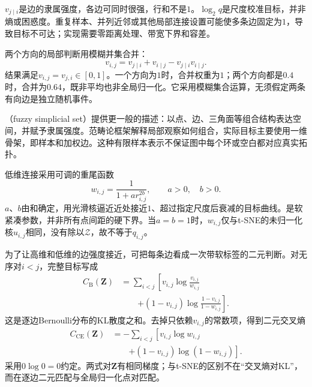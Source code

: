 $v_{j\mid i}$是边的隶属强度，各边可同时很强，行和不是$1$。$\log_2 q$是尺度校准目标，并非熵或困惑度。重复样本、并列近邻或其他局部连接设置可能使多条边固定为$1$，导致目标不可达；实现需要零距离处理、带宽下界和容差。

两个方向的局部判断用模糊并集合并：
\begin{equation}
  \label{eq:dim-umap-union}
  v_{i,j}=v_{j\mid i}+v_{i\mid j}-v_{j\mid i}v_{i\mid j}.
\end{equation}
结果满足$v_{i,j}=v_{j,i}\in[0,1]$。一个方向为$1$时，合并权重为$1$；两个方向都是$0.4$时，合并为$0.64$，既非平均也非全局归一化。它采用模糊集合运算，无须假定两条有向边是独立随机事件。

（fuzzy simplicial set）提供更一般的描述：以点、边、三角面等组合结构表达空间，并赋予隶属强度。范畴论框架解释局部观察如何组合，实际目标主要使用一维骨架，即样本和加权边。这种有限样本表示不保证图中每个环或空白都对应真实拓扑。

低维连接采用可调的重尾函数
\begin{equation}
  \label{eq:dim-umap-kernel}
  w_{i,j}=\frac{1}{1+a r_{i,j}^{2b}},\qquad a>0,\quad b>0.
\end{equation}
$a$、$b$由和确定，用光滑核逼近近处接近$1$、超过指定尺度后衰减的目标曲线。是软紧凑参数，并非所有点间距的硬下界。当$a=b=1$时，$w_{i,j}$仅与t-SNE的未归一化核$u_{i,j}$相同，没有除以$\mathcal{Z}$，故不等于$q_{i,j}$。

为了让高维和低维的边强度接近，可把每条边看成一次带软标签的二元判断。对无序对$i<j$，完整目标写成
\begin{equation}
  \label{eq:dim-umap-bernoulli}
  \begin{aligned}
    C_{\mathrm{B}}(\bm{Z})
      &=\sum_{i<j}\left[
        v_{i,j}\log\frac{v_{i,j}}{w_{i,j}}\right.\\
      &\qquad\left.+
        (1-v_{i,j})\log\frac{1-v_{i,j}}{1-w_{i,j}}
        \right].
  \end{aligned}
\end{equation}
这是逐边Bernoulli分布的KL散度之和。去掉只依赖$v_{i,j}$的常数项，得到二元交叉熵
\begin{equation}
  \label{eq:dim-umap-cross-entropy}
  \begin{aligned}
    C_{\mathrm{CE}}(\bm{Z})
      &=-\sum_{i<j}\left[
        v_{i,j}\log w_{i,j}\right.\\
      &\qquad\left.+
        (1-v_{i,j})\log(1-w_{i,j})\right].
  \end{aligned}
\end{equation}
采用$0\log0=0$约定。两式对$\bm{Z}$有相同梯度；与t-SNE的区别不在“交叉熵对KL”，而在逐边二元匹配与全局归一化点对匹配。

